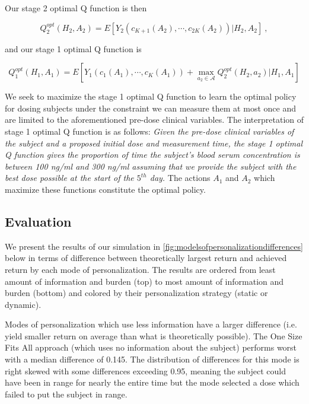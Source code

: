 Our stage 2 optimal Q function is then

\begin{equation}
Q_{2}^{o p t}\left(H_{2}, A_{2}\right)=E\left[Y_2\left(c_{K+1}(A_2), \cdots, c_{2K}(A_2)\right) \Bigg\vert H_{2}, A_{2}\right] \>,
\end{equation}

\noindent and our stage 1 optimal Q function is

\begin{equation}
Q_{1}^{o p t}\left(H_{1}, A_{1}\right)= E \left[Y_1\left(c_{1}(A_1),  \cdots, c_{K}(A_1)\right)+\max _{a_{2} \in \mathscr{A}} Q_{2}^{o p t}\left(H_{2}, a_{2}\right) \Bigg\vert H_{1}, A_{1}\right]
\end{equation}

We seek to maximize the stage 1 optimal Q function to learn the optimal policy for dosing subjects under the constraint we can measure them at most once and are limited to the aforementioned pre-dose clinical variables.  The interpretation of stage 1 optimal Q function is as follows:\textit{ Given the pre-dose clinical variables of the subject and a proposed initial dose and measurement time, the stage 1 optimal Q function gives the proportion of time the subject’s blood serum concentration is between 100 ng/ml and 300 ng/ml assuming that we provide the subject with the best dose possible at the start of the $ 5^{th} $ day.}  The actions $ A_1 $ and $ A_2 $ which maximize these functions constitute the optimal policy.


%


\subsection{Evaluation}

We present the results of our simulation in \cref{fig:modelsofpersonalizationdifferences} below in terms of difference between theoretically largest return and achieved return by each mode of personalization.  The results are ordered from least amount of information and burden (top) to most amount of information and burden (bottom) and colored by their personalization strategy (static or dynamic).

Modes of personalization which use less information have a larger difference (i.e. yield smaller return on average than what is theoretically possible).  The One Size Fits All approach (which uses no information about the subject) performs worst with a median difference of 0.145.  The distribution of differences for this mode is right skewed with some differences exceeding 0.95, meaning the subject could have been in range for nearly the entire time but the mode selected a dose which failed to put the subject in range. 

